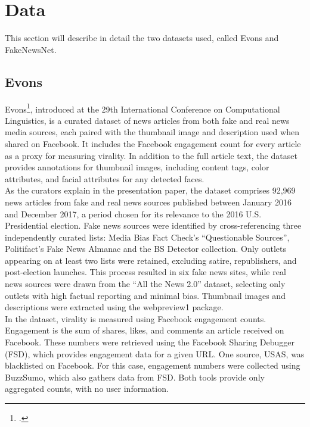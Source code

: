 \documentclass[a4paper,twoside,12pt]{book}
\begin{document}
	\chapter{Data}
	This section will describe in detail the two datasets used, called Evons and FakeNewsNet.
	
	\section{Evons} \label{evons_pres}
	Evons\footcite{krstovski2022}, introduced at the 29th International Conference on Computational Linguistics, is a curated dataset of news articles from both fake and real news media sources, each paired with the thumbnail image and description used when shared on Facebook. It includes the Facebook engagement count for every article as a proxy for measuring virality. In addition to the full article text, the dataset provides annotations for thumbnail images, including content tags, color attributes, and facial attributes for any detected faces. \\
	
	As the curators explain in the presentation paper, the dataset comprises 92,969 news articles from fake and real news sources published between January 2016 and December 2017, a period chosen for its relevance to the 2016 U.S. Presidential election. Fake news sources were identified by cross-referencing three independently curated lists: Media Bias Fact Check’s “Questionable Sources”, Politifact’s Fake News Almanac and the BS Detector collection. Only outlets appearing on at least two lists were retained, excluding satire, republishers, and post-election launches. This process resulted in six fake news sites, while real news sources were drawn from the “All the News 2.0” dataset, selecting only outlets with high factual reporting and minimal bias. Thumbnail images and descriptions were extracted using the webpreview1 package.\\
	
	In the dataset, virality is measured using Facebook engagement counts. Engagement is the sum of shares, likes, and comments an article received on Facebook. These numbers were retrieved using the Facebook Sharing Debugger (FSD), which provides engagement data for a given URL. One source, USAS, was blacklisted on Facebook. For this case, engagement numbers were collected using BuzzSumo, which also gathers data from FSD. Both tools provide only aggregated counts, with no user information.\\
	
\end{document}

